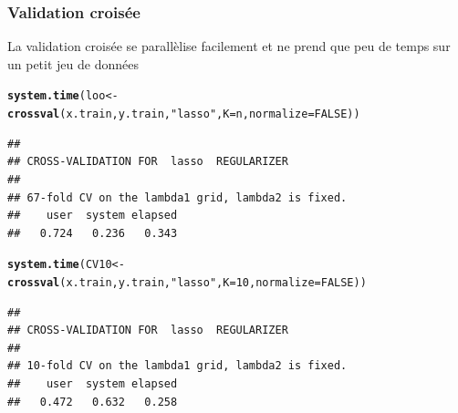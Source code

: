 \documentclass{beamer}\usepackage[]{graphicx}\usepackage[]{color}
\makeatletter
\newcommand{\hlnum}[1]{\textcolor[rgb]{0.686,0.059,0.569}{#1}}%
\newcommand{\hlstr}[1]{\textcolor[rgb]{0.192,0.494,0.8}{#1}}%
\newcommand{\hlstd}[1]{\textcolor[rgb]{0.345,0.345,0.345}{#1}}%
\newcommand{\hlkwb}[1]{\textcolor[rgb]{0.69,0.353,0.396}{#1}}%
\newcommand{\hlkwc}[1]{\textcolor[rgb]{0.333,0.667,0.333}{#1}}%
\newcommand{\hlkwd}[1]{\textcolor[rgb]{0.737,0.353,0.396}{\textbf{#1}}}%
\newenvironment{kframe}{%
 \def\at@end@of@kframe{}%
 \ifinner\ifhmode%
  \def\at@end@of@kframe{\end{minipage}}%
  \begin{minipage}{\columnwidth}%
 \fi\fi%
 \def\FrameCommand##1{\hskip\@totalleftmargin \hskip-\fboxsep
 \colorbox{shadecolor}{##1}\hskip-\fboxsep
     \hskip-\linewidth \hskip-\@totalleftmargin \hskip\columnwidth}%
 \MakeFramed {\advance\hsize-\width
   \@totalleftmargin\z@ \linewidth\hsize
   \@setminipage}}%
 {\par\unskip\endMakeFramed%
 \at@end@of@kframe}
\newenvironment{knitrout}{}{} %
\makeatother
\begin{document}
\begin{frame}[containsverbatim]
  \frametitle{Validation croisée}

  La validation croisée se parallèlise facilement et ne prend que peu de temps sur un petit jeu de données

\begin{knitrout}\scriptsize
{}\color{fgcolor}\begin{kframe}
\begin{alltt}
\hlkwd{system.time}\hlstd{(loo} \hlkwb{<-} \hlkwd{crossval}\hlstd{(x.train,y.train,}\hlstr{"lasso"}\hlstd{,}\hlkwc{K}\hlstd{=n,}\hlkwc{normalize}\hlstd{=}\hlnum{FALSE}\hlstd{))}
\end{alltt}
\begin{verbatim}
## 
## CROSS-VALIDATION FOR  lasso  REGULARIZER 
## 
## 67-fold CV on the lambda1 grid, lambda2 is fixed.
##    user  system elapsed 
##   0.724   0.236   0.343
\end{verbatim}
\end{kframe}
\end{knitrout}

\begin{knitrout}\scriptsize
{}\color{fgcolor}\begin{kframe}
\begin{alltt}
\hlkwd{system.time}\hlstd{(CV10} \hlkwb{<-} \hlkwd{crossval}\hlstd{(x.train,y.train,}\hlstr{"lasso"}\hlstd{,}\hlkwc{K}\hlstd{=}\hlnum{10}\hlstd{,}\hlkwc{normalize}\hlstd{=}\hlnum{FALSE}\hlstd{))}
\end{alltt}
\begin{verbatim}
## 
## CROSS-VALIDATION FOR  lasso  REGULARIZER 
## 
## 10-fold CV on the lambda1 grid, lambda2 is fixed.
##    user  system elapsed 
##   0.472   0.632   0.258
\end{verbatim}
\end{kframe}
\end{knitrout}

\end{frame}
\end{document}
